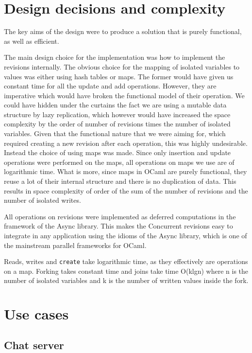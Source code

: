 \documentclass[12pt,twoside,notitlepage]{report}
\begin{document}
\section{Design decisions and complexity}

The key aims of the design were to produce a solution that is purely functional, as well as efficient.

The main design choice for the implementation was how to implement the revisions internally. The obvious choice for the mapping of isolated variables to values was either using hash tables or maps. The former would have given us constant time for all the update and add operations. However, they are imperative which would have broken the functional model of their operation. We could have hidden under the curtains the fact we are using a mutable data structure by lazy replication, which however would have increased the space complexity by the order of number of revisions times the number of isolated variables. Given that the functional nature that we were aiming for, which required creating a new revision after each operation, this was highly undesirable. Instead the choice of using maps was made. Since only insertion and update operations were performed on the maps, all operations on maps we use are of logarithmic time. What is more, since maps in OCaml are purely functional, they reuse a lot of their internal structure and there is no duplication of data. This results in space complexity of order of the sum of the number of revisions and the number of isolated writes. 

All operations on revisions were implemented as deferred computations in the framework of the Async library. This makes the Concurrent revisions easy to integrate in any application using the idioms of the Async library, which is one of the mainstream parallel frameworks for OCaml.

Reads, writes and {\tt create} take logarithmic time, as they effectively are operations on a map. Forking takes constant time and joins take time O(klgn) where n is the number of isolated variables and k is the number of written values inside the fork.     

 
\section{Use cases}
\subsection{Chat server}
\end{document}
